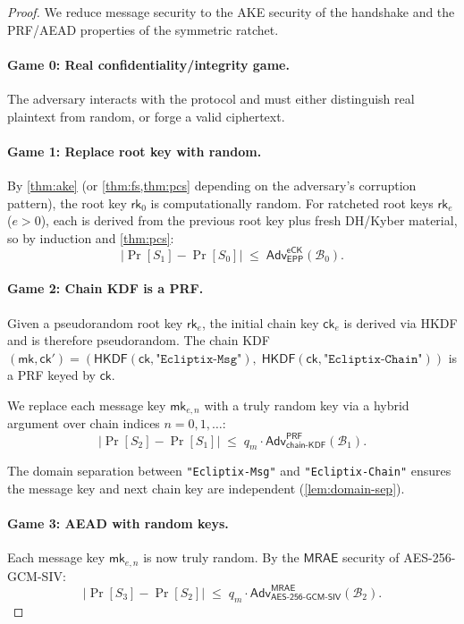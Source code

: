 \documentclass[11pt,a4paper]{article}
\theoremstyle{definition}
\theoremstyle{remark}
\newcommand{\adv}{\mathsf{Adv}}
\newcommand{\advB}{\mathcal{B}}
\newcommand{\HKDF}{\mathsf{HKDF}}
\newcommand{\AEAD}{\mathsf{AES\text{-}256\text{-}GCM\text{-}SIV}}
\newcommand{\MRAE}{\mathsf{MRAE}}
\newcommand{\PRF}{\mathsf{PRF}}
\newcommand{\eCK}{\mathsf{eCK}}
\newcommand{\rk}{\mathsf{rk}}
\newcommand{\ck}{\mathsf{ck}}
\newcommand{\mk}{\mathsf{mk}}
\begin{document}
\begin{proof}
We reduce message security to the AKE security of the handshake and the
PRF/AEAD properties of the symmetric ratchet.

\paragraph{Game 0: Real confidentiality/integrity game.}
The adversary interacts with the protocol and must either distinguish real
plaintext from random, or forge a valid ciphertext.

\paragraph{Game 1: Replace root key with random.}
By \cref{thm:ake} (or \cref{thm:fs,thm:pcs} depending on the adversary's
corruption pattern), the root key $\rk_0$ is computationally random.  For
ratcheted root keys $\rk_e$ ($e > 0$), each is derived from the previous
root key plus fresh DH/Kyber material, so by induction and \cref{thm:pcs}:
\[
  |\Pr[S_1] - \Pr[S_0]| \;\leq\; \adv^{\eCK}_{\mathsf{EPP}}(\advB_0).
\]

\paragraph{Game 2: Chain KDF is a PRF.}
Given a pseudorandom root key $\rk_e$, the initial chain key $\ck_e$ is
derived via HKDF and is therefore pseudorandom.  The chain KDF
$(\mk, \ck') = (\HKDF(\ck, \texttt{"Ecliptix-Msg"}),\;
\HKDF(\ck, \texttt{"Ecliptix-Chain"}))$
is a PRF keyed by $\ck$.

We replace each message key $\mk_{e,n}$ with a truly random key via a
hybrid argument over chain indices $n = 0, 1, \ldots$:
\[
  |\Pr[S_2] - \Pr[S_1]| \;\leq\; q_m \cdot \adv^{\PRF}_{\mathsf{chain\text{-}KDF}}(\advB_1).
\]

The domain separation between \texttt{"Ecliptix-Msg"} and
\texttt{"Ecliptix-Chain"} ensures the message key and next chain key are
independent (\cref{lem:domain-sep}).

\paragraph{Game 3: AEAD with random keys.}
Each message key $\mk_{e,n}$ is now truly random.  By the $\MRAE$
security of AES-256-GCM-SIV:
\[
  |\Pr[S_3] - \Pr[S_2]| \;\leq\; q_m \cdot \adv^{\MRAE}_{\AEAD}(\advB_2).
\]


\end{proof}
\end{document}
